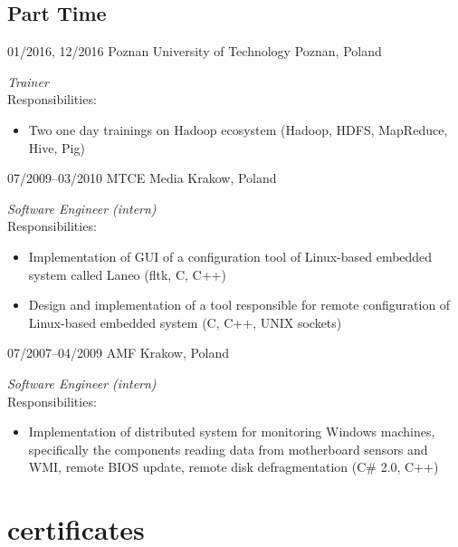 \documentclass[]{gaza-cv} %
\begin{document}
\subsection{Part Time}

\begin{entrylist}

\entry
{01/2016, 12/2016}
{Poznan University of Technology}
{Poznan, Poland}
{\emph{Trainer}\\
Responsibilities:
\begin{itemize}
\item Two one day trainings on Hadoop ecosystem (Hadoop, HDFS, MapReduce, Hive, Pig)
\end{itemize}}


\entry
{07/2009--03/2010}
{MTCE Media}
{Krakow, Poland}
{\emph{ Software Engineer (intern)} \\
Responsibilities:
\begin{itemize}
\item Implementation of GUI of a configuration tool of Linux-based embedded system called Laneo (fltk, C, C++)
\item Design and implementation of a tool responsible for remote configuration of Linux-based embedded system (C, C++, UNIX sockets)
\end{itemize}}


\entry
{07/2007--04/2009}
{AMF}
{Krakow, Poland}
{\emph{Software Engineer (intern)} \\
Responsibilities:
\begin{itemize}
\item Implementation of distributed system for monitoring Windows machines, specifically the components reading data from motherboard sensors and WMI, remote BIOS update, remote disk defragmentation (C\# 2.0, C++)
\end{itemize}}

\end{entrylist}



\section{certificates}
\end{document}
